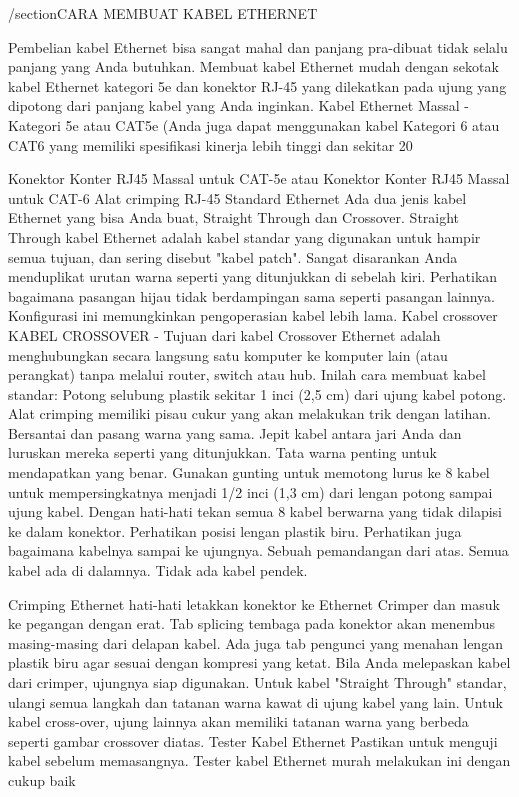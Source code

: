 /section{CARA MEMBUAT KABEL ETHERNET}

Pembelian kabel Ethernet bisa sangat mahal dan panjang pra-dibuat tidak selalu panjang yang Anda butuhkan. Membuat kabel Ethernet mudah dengan sekotak kabel Ethernet kategori 5e dan konektor RJ-45 yang dilekatkan pada ujung yang dipotong dari panjang kabel yang Anda inginkan.
Kabel Ethernet Massal - Kategori 5e atau CAT5e
(Anda juga dapat menggunakan kabel Kategori 6 atau CAT6 yang memiliki spesifikasi kinerja lebih tinggi dan sekitar 20%

Konektor Konter RJ45 Massal untuk CAT-5e atau Konektor Konter RJ45 Massal untuk CAT-6
Alat crimping RJ-45
Standard Ethernet Ada dua jenis kabel Ethernet yang bisa Anda buat, Straight Through dan Crossover.
Straight Through kabel Ethernet adalah kabel standar yang digunakan untuk hampir semua tujuan, dan sering disebut "kabel patch". Sangat disarankan Anda menduplikat urutan warna seperti yang ditunjukkan di sebelah kiri. Perhatikan bagaimana pasangan hijau tidak berdampingan sama seperti pasangan lainnya. Konfigurasi ini memungkinkan pengoperasian kabel lebih lama.
Kabel crossover
KABEL CROSSOVER - Tujuan dari kabel Crossover Ethernet adalah menghubungkan secara langsung satu komputer ke komputer lain (atau perangkat) tanpa melalui router, switch atau hub.
Inilah cara membuat kabel standar:
Potong selubung plastik sekitar 1 inci (2,5 cm) dari ujung kabel potong. Alat crimping memiliki pisau cukur yang akan melakukan trik dengan latihan.
Bersantai dan pasang warna yang sama.
Jepit kabel antara jari Anda dan luruskan mereka seperti yang ditunjukkan. Tata warna penting untuk mendapatkan yang benar.
Gunakan gunting untuk memotong lurus ke 8 kabel untuk mempersingkatnya menjadi 1/2 inci (1,3 cm) dari lengan potong sampai ujung kabel.
Dengan hati-hati tekan semua 8 kabel berwarna yang tidak dilapisi ke dalam konektor. Perhatikan posisi lengan plastik biru. Perhatikan juga bagaimana kabelnya sampai ke ujungnya.
Sebuah pemandangan dari atas. Semua kabel ada di dalamnya. Tidak ada kabel pendek.
 

Crimping Ethernet
hati-hati letakkan konektor ke Ethernet Crimper dan masuk ke pegangan dengan erat. Tab splicing tembaga pada konektor akan menembus masing-masing dari delapan kabel. Ada juga tab pengunci yang menahan lengan plastik biru agar sesuai dengan kompresi yang ketat. Bila Anda melepaskan kabel dari crimper, ujungnya siap digunakan.
Untuk kabel "Straight Through" standar, ulangi semua langkah dan tatanan warna kawat di ujung kabel yang lain. Untuk kabel cross-over, ujung lainnya akan memiliki tatanan warna yang berbeda seperti gambar crossover diatas.
Tester Kabel Ethernet
Pastikan untuk menguji kabel sebelum memasangnya. Tester kabel Ethernet murah melakukan ini dengan cukup baik
